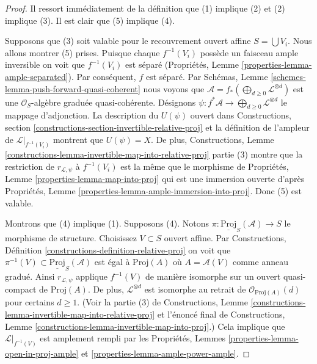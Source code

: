 \begin{proof}
Il ressort immédiatement de la définition que (1) implique (2) et
(2) implique (3). Il est clair que (5) implique (4).

\medskip\noindent
Supposons que (3) soit valable pour le recouvrement
ouvert affine $S = \bigcup V_i$.
Nous allons montrer (5) prises. Puisque
chaque $f^{-1}(V_i)$ possède
un faisceau ample inversible on voit que $f^{-1}(V_i)$
est séparé
(Propriétés, Lemme \ref{properties-lemma-ample-separated}). Par conséquent,
$f$ est séparé. Par Schémas, Lemme \ref{schemes-lemma-push-forward-quasi-coherent} nous voyons
que $\mathcal{A} = f_*(\bigoplus_{d \geq 0} \mathcal{L}^{\otimes d})$ est une $\mathcal{O}_S$-algèbre
graduée quasi-cohérente. Désignons $\psi : f^*\mathcal{A} \to \bigoplus_{d \geq 0} \mathcal{L}^{\otimes d}$ le mappage
d'adjonction.
La description du $U(\psi)$
ouvert dans Constructions,
section \ref{constructions-section-invertible-relative-proj} et
la définition de l'ampleur
de $\mathcal{L}|_{f^{-1}(V_i)}$ montrent que $U(\psi) = X$.
De plus,
Constructions, Lemme \ref{constructions-lemma-invertible-map-into-relative-proj} partie (3) montre
que la restriction de $r_{\mathcal{L}, \psi}$ à
$f^{-1}(V_i)$ est la même que le morphisme
de Propriétés, Lemme \ref{properties-lemma-map-into-proj}
qui est une immersion
ouverte d'après Propriétés, Lemme \ref{properties-lemma-ample-immersion-into-proj}.
Donc (5) est valable.

\medskip\noindent
Montrons que (4) implique (1).
Supposons (4). Notons $\pi : \underline{\text{Proj}}_S(\mathcal{A}) \to S$ le morphisme
de structure. Choisissez $V \subset S$ ouvert
affine. Par Constructions, Définition \ref{constructions-definition-relative-proj}
on voit que $\pi^{-1}(V) \subset \underline{\text{Proj}}_S(\mathcal{A})$ est égal à $\text{Proj}(A)$ où
$A = \mathcal{A}(V)$ comme anneau gradué. Ainsi $r_{\mathcal{L}, \psi}$
applique $f^{-1}(V)$ de manière
isomorphe sur un ouvert
quasi-compact de $\text{Proj}(A)$.
De plus, $\mathcal{L}^{\otimes d}$ est isomorphe au retrait de
$\mathcal{O}_{\text{Proj}(A)}(d)$ pour certains $d \geq 1$.
(Voir la partie (3)
de Constructions, Lemme \ref{constructions-lemma-invertible-map-into-relative-proj} et
l'énoncé final de Constructions,
Lemme \ref{constructions-lemma-invertible-map-into-proj}.) Cela implique
que $\mathcal{L}|_{f^{-1}(V)}$ est amplement
rempli par les Propriétés, Lemmes
\ref{properties-lemma-open-in-proj-ample} et \ref{properties-lemma-ample-power-ample}.


\end{proof}
